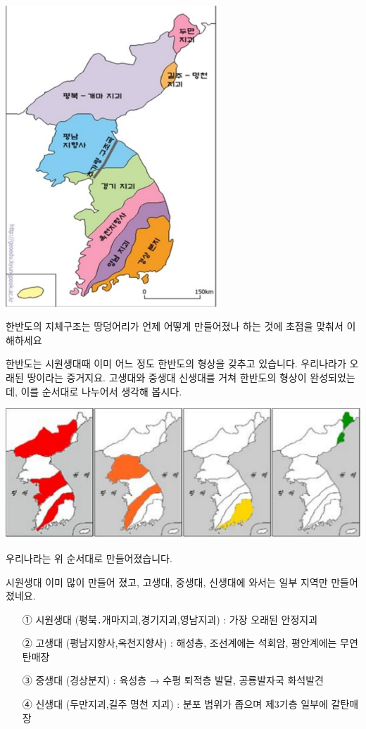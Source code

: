 \documentclass[12pt,a4paper]{book}
\begin{document}
		\includegraphics[width=0.60\textwidth]{./fig/fig_003.pdf}


한반도의 지체구조는 땅덩어리가 언제 어떻게 만들어졌나 하는 것에 초점을 맞춰서 이해하세요~

한반도는 시원생대때 이미 어느 정도 한반도의 형상을 갖추고 있습니다. 우리나라가 오래된 땅이라는 증거지요. 고생대와 중생대 신생대를 거쳐 한반도의 형상이 완성되었는데, 이를 순서대로 나누어서 생각해 봅시다. 


		\includegraphics[width=1.00\textwidth]{./fig/fig_004.pdf}


우리나라는 위 순서대로 만들어졌습니다. 

시원생대 이미 많이 만들어 졌고, 고생대, 중생대, 신생대에 와서는 일부 지역만 만들어졌네요. 

		\begin{itemize}[itemsep=0.0em]
		\item	[①] 시원생대 (평북․개마지괴,경기지괴,영남지괴) : 가장 오래된 안정지괴
		\item	[②] 고생대 (평남지향사,옥천지향사) : 해성층, 조선계에는 석회암, 평안계에는 무연탄매장
		\item	[③] 중생대 (경상분지) : 육성층 → 수평 퇴적층 발달, 공룡발자국 화석발견
		\item	[④] 신생대 (두만지괴,길주 명천 지괴) : 분포 범위가 좁으며 제3기층 일부에 갈탄매장
		\end{itemize}	
\end{document}

